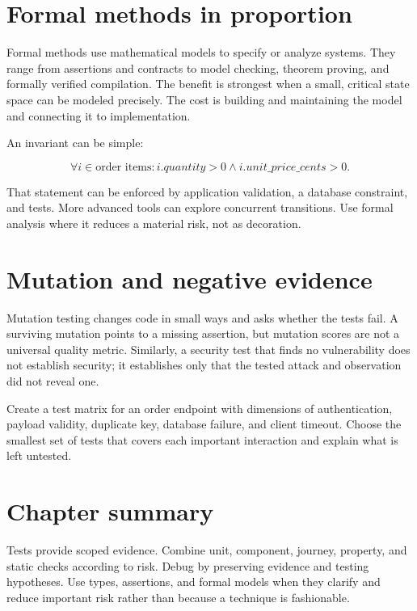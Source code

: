 \section{Formal methods in proportion}
Formal methods use mathematical models to specify or analyze systems. They range
from assertions and contracts to model checking, theorem proving, and formally
verified compilation. The benefit is strongest when a small, critical state space
can be modeled precisely. The cost is building and maintaining the model and
connecting it to implementation.

An invariant can be simple:

\[
  \forall i \in \text{order items}: i.quantity > 0 \land i.unit\_price\_cents > 0.
\]

That statement can be enforced by application validation, a database constraint,
and tests. More advanced tools can explore concurrent transitions. Use formal
analysis where it reduces a material risk, not as decoration.

\section{Mutation and negative evidence}
Mutation testing changes code in small ways and asks whether the tests fail. A
surviving mutation points to a missing assertion, but mutation scores are not a
universal quality metric. Similarly, a security test that finds no vulnerability
does not establish security; it establishes only that the tested attack and
observation did not reveal one.

\begin{exercise}
Create a test matrix for an order endpoint with dimensions of authentication,
payload validity, duplicate key, database failure, and client timeout. Choose the
smallest set of tests that covers each important interaction and explain what is
left untested.
\end{exercise}

\section{Chapter summary}
Tests provide scoped evidence. Combine unit, component, journey, property, and
static checks according to risk. Debug by preserving evidence and testing
hypotheses. Use types, assertions, and formal models when they clarify and reduce
important risk rather than because a technique is fashionable.
